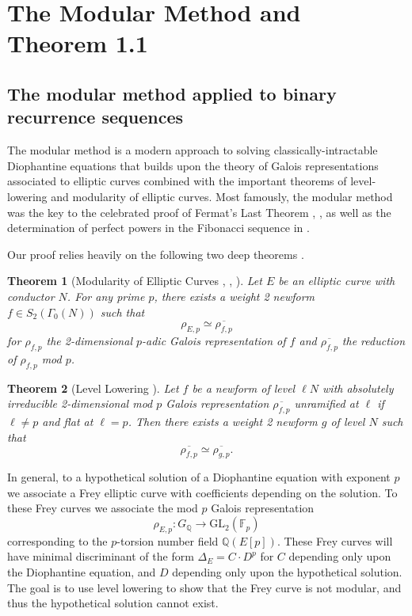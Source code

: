 \documentclass[12pt]{amsart}
\newtheorem{thm}{Theorem}[section]
\theoremstyle{definition}
\def\F{{\mathbb F}}
\def\Q{{\mathbb Q}}
\newcommand{\GL}{\text{GL}}
\renewcommand{\bar}{\overline}
\begin{document}
\section{The Modular Method and Theorem 1.1}

\subsection{The modular method applied to binary recurrence sequences}

The modular method is a modern approach to solving classically-intractable Diophantine equations that builds upon the theory of Galois representations associated to elliptic curves combined with the important theorems of level-lowering and modularity of elliptic curves.  Most famously, the modular method was the key to the celebrated proof of Fermat's Last Theorem \cite{wiles95}, \cite{taylorwiles95}, as well as the determination of perfect powers in the Fibonacci sequence in \cite{siksek06}.

Our proof relies heavily on the following two deep theorems .

\begin{thm}[Modularity of Elliptic Curves \cite{wiles95}, \cite{taylorwiles95}, \cite{conrad01}]\label{modularity}
Let $E$ be an elliptic curve with conductor $N$.  For any prime $p$, there exists a weight 2 newform $f \in S_2(\Gamma_0(N))$ such that
\[ \rho_{E,p} \simeq \bar{\rho_{f,p}} \]
for $\rho_{f,p}$ the 2-dimensional $p$-adic Galois representation of $f$ and $\bar{\rho_{f,p}}$ the reduction of $\rho_{f,p}$ mod $p$.
\end{thm}

\begin{thm}[Level Lowering \cite{ribet91}]\label{levellow}
Let $f$ be a newform of level $\ell N$ with absolutely irreducible 2-dimensional mod $p$ Galois representation $\bar{\rho_{f,p}}$ unramified at $\ell$ if $\ell \neq p$ and flat at $\ell = p$.  Then there exists a weight 2 newform $g$ of level $N$ such that
\[ \bar{\rho_{f,p}} \simeq \bar{\rho_{g,p}}. \]
\end{thm}


In general, to a hypothetical solution of a Diophantine equation with exponent $p$ we associate a Frey elliptic curve with coefficients depending on the solution.  To these Frey curves we associate the mod $p$ Galois representation
\[ \rho_{E,p}: G_{\Q} \rightarrow \GL_2(\F_p) \]
corresponding to the $p$-torsion number field $\Q(E[p])$.  These Frey curves will have minimal discriminant of the form $\Delta_E = C \cdot D^p$ for $C$ depending only upon the Diophantine equation, and $D$ depending only upon the hypothetical solution.  The goal is to use level lowering to show that the Frey curve is not modular, and thus the hypothetical solution cannot exist. 
\end{document}
